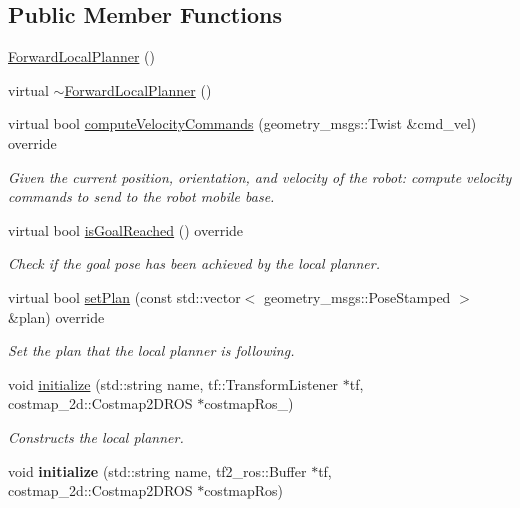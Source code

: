 \subsection*{Public Member Functions}
\begin{DoxyCompactItemize}
\item 
\hyperlink{classforward__local__planner_1_1ForwardLocalPlanner_a799b88b11a20f65c49f08090092de578}{Forward\-Local\-Planner} ()
\item 
virtual \hyperlink{classforward__local__planner_1_1ForwardLocalPlanner_ac842ee5e8465cb9038adf5596b5c4469}{$\sim$\-Forward\-Local\-Planner} ()
\item 
virtual bool \hyperlink{classforward__local__planner_1_1ForwardLocalPlanner_af66bd75aa18afa2f027f1951dfe18b41}{compute\-Velocity\-Commands} (geometry\-\_\-msgs\-::\-Twist \&cmd\-\_\-vel) override
\begin{DoxyCompactList}\small\item\em Given the current position, orientation, and velocity of the robot\-: compute velocity commands to send to the robot mobile base. \end{DoxyCompactList}\item 
virtual bool \hyperlink{classforward__local__planner_1_1ForwardLocalPlanner_a76d7b463fbe432b6af22d12270a1c2bd}{is\-Goal\-Reached} () override
\begin{DoxyCompactList}\small\item\em Check if the goal pose has been achieved by the local planner. \end{DoxyCompactList}\item 
virtual bool \hyperlink{classforward__local__planner_1_1ForwardLocalPlanner_a63db153f4977a9336dc992cb92415cd7}{set\-Plan} (const std\-::vector$<$ geometry\-\_\-msgs\-::\-Pose\-Stamped $>$ \&plan) override
\begin{DoxyCompactList}\small\item\em Set the plan that the local planner is following. \end{DoxyCompactList}\item 
void \hyperlink{classforward__local__planner_1_1ForwardLocalPlanner_a0ae17e1f6fd009d1ec223135891a548a}{initialize} (std\-::string name, tf\-::\-Transform\-Listener $\ast$tf, costmap\-\_\-2d\-::\-Costmap2\-D\-R\-O\-S $\ast$costmap\-Ros\-\_\-)
\begin{DoxyCompactList}\small\item\em Constructs the local planner. \end{DoxyCompactList}\item 
\hypertarget{classforward__local__planner_1_1ForwardLocalPlanner_a62a79a2c97359b566419731e3f2d0175}{void {\bfseries initialize} (std\-::string name, tf2\-\_\-ros\-::\-Buffer $\ast$tf, costmap\-\_\-2d\-::\-Costmap2\-D\-R\-O\-S $\ast$costmap\-Ros)}\label{classforward__local__planner_1_1ForwardLocalPlanner_a62a79a2c97359b566419731e3f2d0175}


\end{DoxyCompactItemize}
